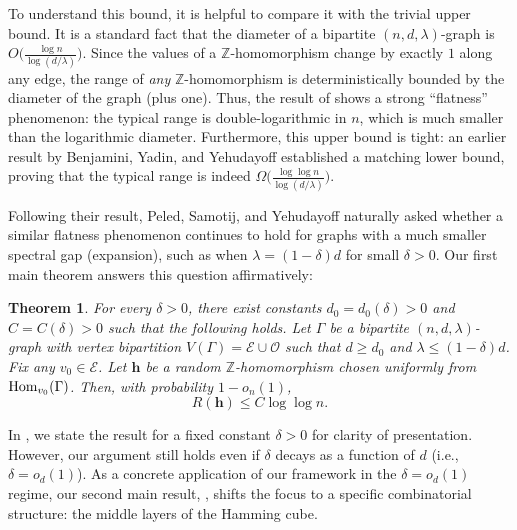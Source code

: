 \documentclass{amsart}
\newtheorem{thm}{Theorem}[section]
\theoremstyle{definition}
\newcommand{\cO}{\mathcal{O} }
\newcommand{\cE}{\mathcal{E} }
\newcommand{\0}[0]{\emptyset}
\newcommand{\Hom}[0]{\mbox{\rm{Hom}}}
\begin{document}
To understand this bound, it is helpful to compare it with the trivial upper bound. It is a standard fact that the diameter of a bipartite $(n,d,\lambda)$-graph is $O\big( \frac{\log n}{\log (d/\lambda)} \big)$. Since the values of a $\mathbb{Z}$-homomorphism change by exactly $1$ along any edge, the range of \textit{any} $\mathbb{Z}$-homomorphism is deterministically bounded by the diameter of the graph (plus one). Thus, the result of \cite{peled2013lipschitz} shows a strong ``flatness'' phenomenon: the typical range is double-logarithmic in $n$, which is much smaller than the logarithmic diameter. Furthermore, this upper bound is tight: an earlier result by Benjamini, Yadin, and Yehudayoff \cite{benjamini2007random} established a matching lower bound, proving that the typical range is indeed $\Omega\big( \frac{\log \log n}{\log (d/\lambda)} \big)$.

Following their result, Peled, Samotij, and Yehudayoff naturally asked whether a similar flatness phenomenon continues to hold for graphs with a much smaller spectral gap (expansion), such as when $\lambda = (1-\delta)d$ for small $\delta > 0$. Our first main theorem answers this question affirmatively:

\begin{thm}\label{thm:Z-hom-spectral-expanders}
For every $\delta>0$, there exist constants $d_0=d_0(\delta)>0$ and $C=C(\delta)>0$ such that the following holds. Let $\Gamma$ be a bipartite $(n,d,\lambda)$-graph with vertex bipartition $V(\Gamma)=\cE\cup \cO$ such that $d \ge d_0$ and $\lambda\le (1-\delta)d$. Fix any $v_0\in \cE$. Let $\mathbf h$ be a random $\mathbb Z$-homomorphism chosen uniformly from $\Hom_{v_0}(\Gamma)$. Then, with probability $1-o_n(1)$,
\[
R(\mathbf h)\leq C\log\log n.
\]
\end{thm}

In , we state the result for a fixed constant $\delta>0$ for clarity of presentation. However, our argument still holds even if $\delta$ decays as a function of $d$ (i.e., $\delta = o_d(1)$). As a concrete application of our framework in the $\delta = o_d(1)$ regime, our second main result, , shifts the focus to a specific combinatorial structure: the middle layers of the Hamming cube. 
\end{document}
